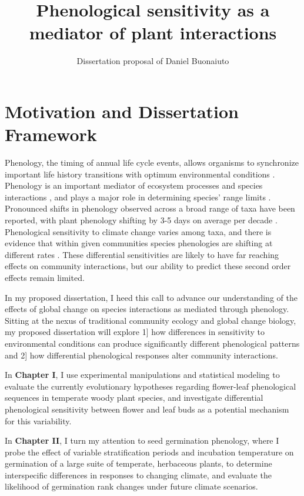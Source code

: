 \documentclass{article}\usepackage[]{graphicx}\usepackage[]{color}
\begin{document}
\title{Phenological sensitivity as a mediator of plant interactions}
\author{Dissertation proposal of Daniel Buonaiuto}
\maketitle{}
\section*{Motivation and Dissertation Framework}
\indent\indent Phenology, the timing of annual life cycle events, allows organisms to synchronize important life history transitions with optimum environmental conditions \citep{Forrest2010}. Phenology is an important mediator of ecosystem processes \citep{Piao2007,Cleland2007} and species interactions \citep{Yang2010,Leverett2017}, and plays a major role in determining species' range limits \citep{Chuine2001}. Pronounced shifts in phenology observed across a broad range of taxa have been reported, with plant phenology shifting by 3-5 days on average per decade \citep{Parmesan2003,Menzel2006,Root2003}. Phenological sensitivity to climate change varies among taxa, and there is evidence that within given communities species phenologies are shifting at different rates \citep{Cleland2012,Ovaskainen2013}. These differential sensitivities are likely to have far reaching effects on community interactions, but our ability to predict these second order effects remain limited.
\par In my proposed dissertation, I heed this call to advance our understanding of the effects of global change on species interactions as mediated through phenology. Sitting at the nexus of traditional community ecology and global change biology, my proposed dissertation will explore 1] how differences in sensitivity to environmental conditions can produce significantly different phenological patterns and 2] how differential phenological responses alter community interactions.
\par In \textbf{Chapter I}, I use experimental manipulations and statistical modeling to evaluate the currently evolutionary hypotheses regarding flower-leaf phenological sequences in temperate woody plant species, and investigate differential phenological sensitivity between flower and leaf buds as a potential mechanism for this variability.
\par In \textbf{Chapter II}, I turn my attention to seed germination phenology, where I probe the effect of variable stratification periods and incubation temperature on germination of a large suite of temperate, herbaceous plants, to determine interspecific differences in responses to changing climate, and evaluate the likelihood of germination rank changes under future climate scenarios.
\end{document}
